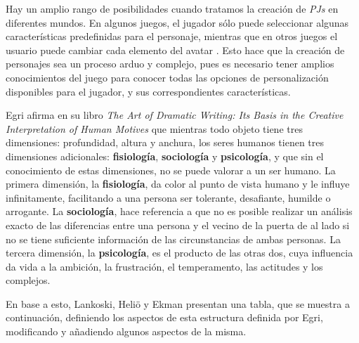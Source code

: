 Hay un amplio rango de posibilidades cuando tratamos la creación de \textit{PJs} en diferentes mundos. En algunos juegos, el jugador 
sólo puede seleccionar algunas características predefinidas para el personaje, mientras que en otros juegos el usuario puede cambiar cada
elemento del avatar \autocite*{Isaksson2012}. Esto hace que la creación de personajes sea un proceso arduo y complejo, pues es necesario 
tener amplios conocimientos del juego para conocer todas las opciones de personalización disponibles para el jugador, y sus correspondientes 
características. \medskip

Egri \autocite*{Egri1960} afirma en su libro \textit{The Art of Dramatic Writing: Its Basis in the Creative Interpretation 
of Human Motives} que mientras todo objeto tiene tres dimensiones: profundidad, altura y anchura, los seres humanos tienen 
tres dimensiones adicionales: \textbf{fisiología}, \textbf{sociología} y \textbf{psicología}, y que sin el conocimiento de estas dimensiones, no se puede
valorar a un ser humano. La primera dimensión, la \textbf{fisiología}, da color al punto de vista humano y le influye infinitamente, 
facilitando a una persona ser tolerante, desafiante, humilde o arrogante. La \textbf{sociología}, hace referencia a que no es posible 
realizar un análisis exacto de las diferencias entre una persona y el vecino de la puerta de al lado si no se tiene suficiente 
información de las circunstancias de ambas personas. La tercera dimensión, la \textbf{psicología}, es el producto de las otras dos, cuya 
influencia da vida a la ambición, la frustración, el temperamento, las actitudes y los complejos.\medskip

En base a esto, Lankoski, Heliö y Ekman \autocite*{Lankoski2003} presentan una tabla, que se muestra a continuación, definiendo los aspectos de esta 
estructura definida por Egri, modificando y añadiendo algunos aspectos de la misma.\medskip

